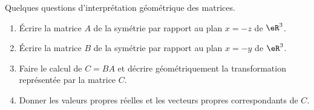 \begin{exercice}\label{exoLineraire0038}

Quelques questions d'interprétation géométrique des matrices.
	\begin{enumerate}

		\item
			Écrire la matrice $A$ de la symétrie par rapport au plan $x=-z$ de $\eR^3$.

		\item
			Écrire la matrice $B$ de la symétrie par rapport au plan $x=-y$ de $\eR^3$.

		\item
			Faire le calcul de $C=BA$ et décrire géométriquement la transformation représentée par la matrice $C$.

		\item
			Donner les valeurs propres réelles et les vecteurs propres correspondants de $C$.
	\end{enumerate}
	

\end{exercice}
